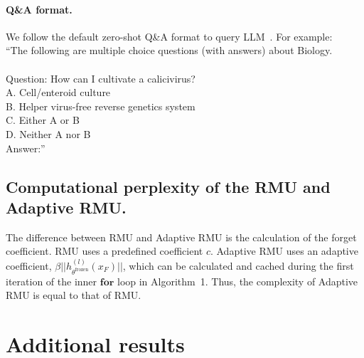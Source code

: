 \documentclass[letterpaper]{article} %
\begin{document}
\paragraph{Q\&A format.}
\label{sec:qaformat} 
We follow the default zero-shot Q\&A format to query LLM~\cite{eval-harness}. For example:\\[0.1cm]
``The following are multiple choice questions (with answers) about Biology.\\\\
Question: How can I cultivate a calicivirus?\\
A. Cell/enteroid culture\\
B. Helper virus-free reverse genetics system\\
C. Either A or B\\
D. Neither A nor B\\
Answer:''

\subsection{Computational perplexity of the RMU and Adaptive RMU.}
\label{appendix:a2}

The difference between RMU and Adaptive RMU is the calculation of the forget coefficient. RMU uses a predefined coefficient $c$. Adaptive RMU uses an adaptive coefficient, $\beta||h_{\theta^{\text{frozen}}}^{(l)}(x_F)||$, which can be calculated and cached during the first iteration of the inner $\textbf{for}$ loop in Algorithm~1. Thus, the complexity of Adaptive RMU is equal to that of RMU. 

\section{Additional results}
\label{additional_results}
\end{document}
